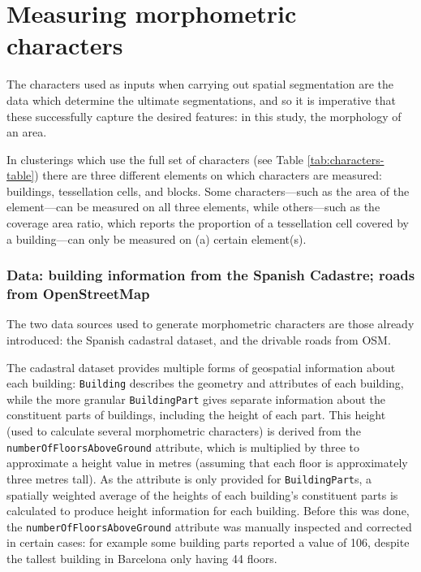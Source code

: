 \documentclass[a4paper, nobind]{templates/ociamthesis}
\begin{document}
\hypertarget{measuring-morphometric-characters}{%
\section{Measuring morphometric characters}\label{measuring-morphometric-characters}}

The characters used as inputs when carrying out spatial segmentation are the data which determine the ultimate segmentations, and so it is imperative that these successfully capture the desired features: in this study, the morphology of an area.

In clusterings which use the full set of characters (see Table \ref{tab:characters-table}) there are three different elements on which characters are measured: buildings, tessellation cells, and blocks. Some characters---such as the area of the element---can be measured on all three elements, while others---such as the coverage area ratio, which reports the proportion of a tessellation cell covered by a building---can only be measured on (a) certain element(s).

\hypertarget{data-building-information-from-the-spanish-cadastre-roads-from-openstreetmap}{%
\subsubsection{Data: building information from the Spanish Cadastre; roads from OpenStreetMap}\label{data-building-information-from-the-spanish-cadastre-roads-from-openstreetmap}}

The two data sources used to generate morphometric characters are those already introduced: the Spanish cadastral dataset, and the drivable roads from OSM.

The cadastral dataset provides multiple forms of geospatial information about each building: \texttt{Building} describes the geometry and attributes of each building, while the more granular \texttt{BuildingPart} gives separate information about the constituent parts of buildings, including the height of each part. This height (used to calculate several morphometric characters) is derived from the \texttt{numberOfFloorsAboveGround} attribute, which is multiplied by three to approximate a height value in metres (assuming that each floor is approximately three metres tall). As the attribute is only provided for \texttt{BuildingPart}s, a spatially weighted average of the heights of each building's constituent parts is calculated to produce height information for each building. Before this was done, the \texttt{numberOfFloorsAboveGround} attribute was manually inspected and corrected in certain cases: for example some building parts reported a value of 106, despite the tallest building in Barcelona only having 44 floors.
\end{document}
